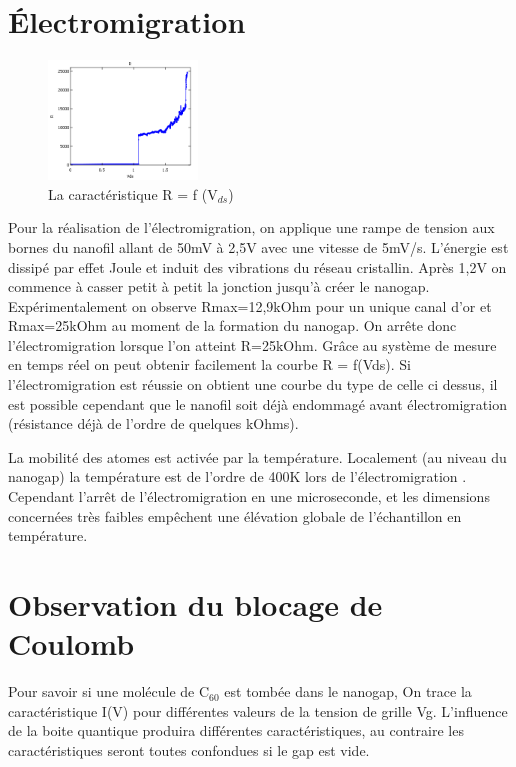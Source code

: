 \section{Électromigration}
\begin{figure}[h]
    \begin{center}
        \includegraphics[width=150px]{Images/4_Image_Electromigration_1.png}
        \caption{La caractéristique R = f (V$_{ds}$)}
    \end{center}
\end{figure}
Pour la réalisation de l'électromigration, on applique une rampe de tension aux bornes du nanofil allant de 50mV à 2,5V avec une vitesse de 5mV/s.
L'énergie est dissipé par effet Joule et induit des vibrations du réseau cristallin. Après 1,2V  on commence à casser petit à petit la jonction jusqu'à créer le nanogap. Expérimentalement on observe Rmax=12,9kOhm pour un unique canal d'or et Rmax=25kOhm au moment de la formation du nanogap. On arrête donc l'électromigration lorsque l'on atteint R=25kOhm.
Grâce au système de mesure en temps réel on peut obtenir facilement la courbe R = f(Vds). Si l'électromigration est réussie on obtient une courbe du type de celle ci dessus, il est possible cependant que le nanofil soit déjà endommagé avant électromigration (résistance déjà de l'ordre de quelques kOhms). 

La mobilité des atomes est activée par la température. Localement (au niveau du nanogap) la température est de l'ordre de 400K lors de l'électromigration \cite{11}. Cependant l'arrêt de l'électromigration en une microseconde, et les dimensions concernées très faibles empêchent une élévation globale de l'échantillon en température.


\section{Observation du blocage de Coulomb}
Pour savoir si une molécule de C$_{60}$ est tombée dans le nanogap, On trace la caractéristique I(V) pour différentes valeurs de la tension de grille Vg. L'influence de la boite quantique produira différentes caractéristiques, au contraire les caractéristiques seront toutes confondues si le gap est vide.\medskip 

